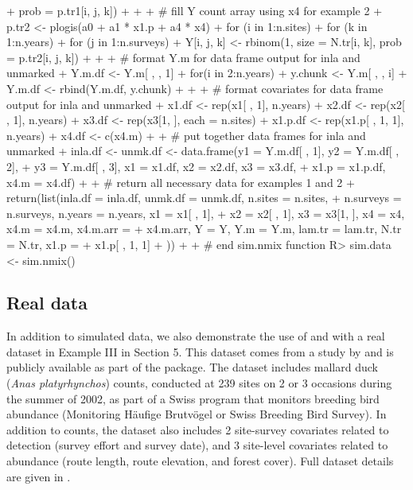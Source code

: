 \documentclass[codesnippet]{jss}
\begin{document}
\begin{CodeInput}
{{{{+            prob = p.tr1[i, j, k])
+    }}}
+
+    # fill Y count array using x4 for example 2
+    p.tr2 <- plogis(a0 + a1 * x1.p + a4 * x4)
+    for (i in 1:n.sites){
+      for (k in 1:n.years){
+        for (j in 1:n.surveys){
+          Y[i, j, k] <- rbinom(1, size = N.tr[i, k], prob = p.tr2[i, j, k])
+    }}}
+
+    # format Y.m for data frame output for inla and unmarked
+    Y.m.df <- Y.m[ , , 1]
+    for(i in 2:n.years){
+      y.chunk <- Y.m[ , , i]
+      Y.m.df <- rbind(Y.m.df, y.chunk)
+    }
+
+    # format covariates for data frame output for inla and unmarked
+    x1.df <- rep(x1[ , 1], n.years)
+    x2.df <- rep(x2[ , 1], n.years)
+    x3.df <- rep(x3[1, ], each = n.sites)
+    x1.p.df <- rep(x1.p[ , 1, 1], n.years)
+    x4.df <- c(x4.m)
+
+    # put together data frames for inla and unmarked
+    inla.df <- unmk.df <- data.frame(y1 = Y.m.df[ , 1], y2 = Y.m.df[ , 2],
+      y3 = Y.m.df[ , 3], x1 = x1.df, x2 = x2.df, x3 = x3.df,
+      x1.p = x1.p.df, x4.m = x4.df)
+
+    # return all necessary data for examples 1 and 2
+    return(list(inla.df = inla.df, unmk.df = unmk.df, n.sites = n.sites,
+      n.surveys = n.surveys, n.years = n.years, x1 = x1[ , 1],
+      x2 = x2[ , 1], x3 = x3[1, ], x4 = x4, x4.m = x4.m, x4.m.arr = 
+      x4.m.arr, Y = Y, Y.m = Y.m, lam.tr = lam.tr, N.tr = N.tr, x1.p = 
+        x1.p[ , 1, 1]
+    ))
+
+  } # end sim.nmix function
R> sim.data <- sim.nmix()
\end{CodeInput}

\subsection[Real data]{Real data}
In addition to simulated data, we also demonstrate the use of  and  with a real dataset in Example III in Section 5. This dataset comes from a study by \cite{Kery_Royle_Schmid_2005} and is publicly available as part of the  package. The dataset includes mallard duck (\emph{Anas platyrhynchos}) counts, conducted at 239 sites on 2 or 3 occasions during the summer of 2002, as part of a Swiss program that monitors breeding bird abundance (Monitoring H\"{a}ufige Brutv\"{o}gel or Swiss Breeding Bird Survey). In addition to counts, the dataset also includes 2 site-survey covariates related to detection (survey effort and survey date), and 3 site-level covariates related to abundance (route length, route elevation, and forest cover). Full dataset details are given in \cite{Kery_Royle_Schmid_2005}.

\end{document}
